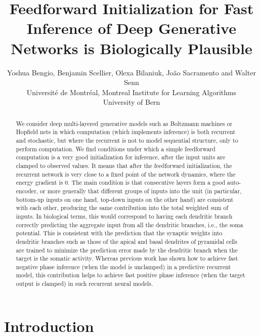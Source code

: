 \documentclass{article}
\title{Feedforward Initialization for Fast Inference of Deep Generative Networks is Biologically Plausible}
\author{
  Yoshua Bengio, Benjamin Scellier, Olexa Bilaniuk, Jo\~{a}o Sacramento and Walter Senn\\
  Universit\'{e} de Montr\'{e}al, Montreal Institute for Learning Algorithms\\
  University of Bern\\
}
\begin{document}
\maketitle



\begin{abstract}
  We consider deep multi-layered generative models such as Boltzmann machines or Hopfield nets in which computation (which implements inference) is both recurrent and stochastic, but where the recurrent is not to model sequential structure, only to perform computation. We find conditions under which a simple feedforward computation is a very good initialization for inference, after the input units are clamped to observed values. It means that after the feedforward initialization, the recurrent network is very close to a fixed point of the network dynamics, where the energy gradient is 0. The main condition is that consecutive layers form a good auto-encoder, or more generally that different groups of inputs into the unit (in particular, bottom-up inputs on one hand, top-down inputs on the other hand) are consistent with each other, producing the same contribution into the total weighted sum of inputs. In biological terms, this would correspond to having each dendritic branch correctly predicting the aggregate input from all the dendritic branches, i.e., the soma potential. This is consistent with the prediction that the synaptic weights into dendritic branches such as those of the apical and basal dendrites of pyramidal cells are trained to minimize the prediction error made by the dendritic branch when the target is the somatic activity. Whereas previous work has shown how to achieve fast negative phase inference (when the model is unclamped) in a predictive recurrent model, this contribution helps to achieve fast positive phase inference (when the target output is clamped) in such recurrent neural models.
\end{abstract}

\section{Introduction}
\end{document}
